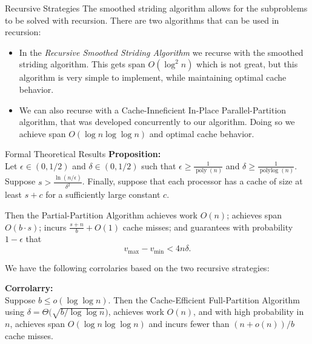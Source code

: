 \documentclass[table,serif,mathserif,final]{beamer}
\newcommand{\polylog}{\operatorname{polylog}}
\newcommand{\poly}{\operatorname{poly}}
\theoremstyle{remark}
\begin{document}
\begin{frame}{}

\begin{block}{\Huge Recursive Strategies}
  \justifying
  \Huge The smoothed striding algorithm allows for the subproblems to be solved with recursion. There are two algorithms that can be used in recursion: \\
	\begin{itemize}
    \item In the \emph{Recursive Smoothed Striding Algorithm} we recurse with the smoothed striding algorithm. {\color{red}This gets span $O(\log^2 n)$ which is not great,} but this algorithm {\color{green}is very simple to implement, while maintaining optimal cache behavior}.
    \item We can also recurse with a Cache-Inneficient In-Place Parallel-Partition algorithm, that was developed concurrently to our algorithm. Doing so we achieve span $O(\log n \log\log n)$ and optimal cache behavior.
	\end{itemize}
\end{block}
\vspace{1cm}

\begin{block}{\Huge Formal Theoretical Results }
  \Huge
  \textbf{Proposition:\\}
  Let $\epsilon \in (0, 1/2)$ and $\delta \in (0, 1/2)$ such that
  $\epsilon \ge \frac{1}{\poly(n)}$ and $\delta \ge
  \frac{1}{\polylog(n)}$. Suppose $s > \frac{\ln
    (n/\epsilon)}{\delta^2}$. Finally, suppose that each processor has
  a cache of size at least $s + c$ for a sufficiently large constant
  $c$.

  Then the Partial-Partition Algorithm achieves work $O(n)$; achieves
  span $O\left(b \cdot s\right)$; incurs $\frac{s+n}{b} + O(1)$ cache
  misses; and guarantees with probability $1 - \epsilon$ that
  $$v_{\text{max}}-v_{\text{min}} < 4 n \delta.$$
  
  We have the following corrolaries based on the two recursive strategies: 

  \textbf{Corrolarry: \\}
Suppose $b \le o(\log \log n)$. Then the Cache-Efficient Full-Partition Algorithm using $\delta = \Theta\big(\sqrt{b/\log\log n}\big)$, achieves work $O(n)$, and with high probability in $n$, achieves span $O(\log n \log\log n)$ and incurs fewer than $(n+o(n))/b$ cache misses.\\


\end{block}
\end{frame}
\end{document}
